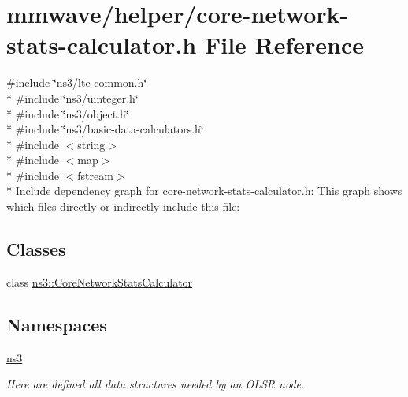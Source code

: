 \hypertarget{core-network-stats-calculator_8h}{}\section{mmwave/helper/core-\/network-\/stats-\/calculator.h File Reference}
\label{core-network-stats-calculator_8h}
{\ttfamily \#include \char`\"{}ns3/lte-\/common.\+h\char`\"{}}\\*
{\ttfamily \#include \char`\"{}ns3/uinteger.\+h\char`\"{}}\\*
{\ttfamily \#include \char`\"{}ns3/object.\+h\char`\"{}}\\*
{\ttfamily \#include \char`\"{}ns3/basic-\/data-\/calculators.\+h\char`\"{}}\\*
{\ttfamily \#include $<$string$>$}\\*
{\ttfamily \#include $<$map$>$}\\*
{\ttfamily \#include $<$fstream$>$}\\*
Include dependency graph for core-\/network-\/stats-\/calculator.h\+:
This graph shows which files directly or indirectly include this file\+:
\subsection*{Classes}
\begin{DoxyCompactItemize}
\item 
class \hyperlink{classns3_1_1CoreNetworkStatsCalculator}{ns3\+::\+Core\+Network\+Stats\+Calculator}
\end{DoxyCompactItemize}
\subsection*{Namespaces}
\begin{DoxyCompactItemize}
\item 
 \hyperlink{namespacens3}{ns3}
\begin{DoxyCompactList}\small\item\em Here are defined all data structures needed by an O\+L\+SR node. \end{DoxyCompactList}\end{DoxyCompactItemize}

